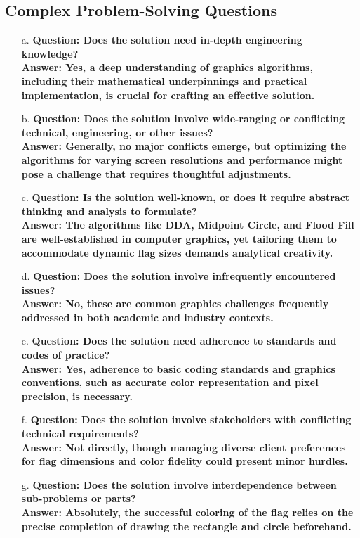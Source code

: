 \documentclass[12pt]{article}
\begin{document}
\subsection*{Complex Problem-Solving Questions}
\begin{enumerate}
    \item[a.] \textbf{Question: Does the solution need in-depth engineering knowledge?} \\
        \textbf{Answer: Yes, a deep understanding of graphics algorithms, including their mathematical underpinnings and practical implementation, is crucial for crafting an effective solution.}
    \item[b.] \textbf{Question: Does the solution involve wide-ranging or conflicting technical, engineering, or other issues?} \\
        \textbf{Answer: Generally, no major conflicts emerge, but optimizing the algorithms for varying screen resolutions and performance might pose a challenge that requires thoughtful adjustments.}
    \item[c.] \textbf{Question: Is the solution well-known, or does it require abstract thinking and analysis to formulate?} \\
        \textbf{Answer: The algorithms like DDA, Midpoint Circle, and Flood Fill are well-established in computer graphics, yet tailoring them to accommodate dynamic flag sizes demands analytical creativity.}
    \item[d.] \textbf{Question: Does the solution involve infrequently encountered issues?} \\
        \textbf{Answer: No, these are common graphics challenges frequently addressed in both academic and industry contexts.}
    \item[e.] \textbf{Question: Does the solution need adherence to standards and codes of practice?} \\
        \textbf{Answer: Yes, adherence to basic coding standards and graphics conventions, such as accurate color representation and pixel precision, is necessary.}
    \item[f.] \textbf{Question: Does the solution involve stakeholders with conflicting technical requirements?} \\
        \textbf{Answer: Not directly, though managing diverse client preferences for flag dimensions and color fidelity could present minor hurdles.}
    \item[g.] \textbf{Question: Does the solution involve interdependence between sub-problems or parts?} \\
        \textbf{Answer: Absolutely, the successful coloring of the flag relies on the precise completion of drawing the rectangle and circle beforehand.}
\end{enumerate}
\end{document}
